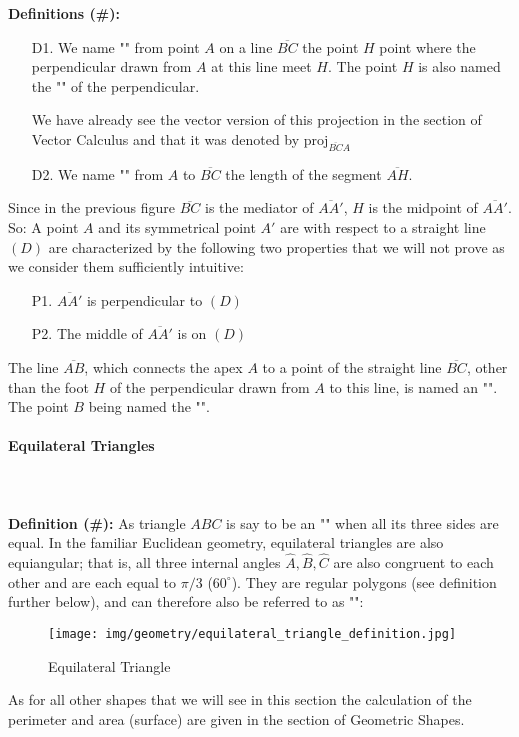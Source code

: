 	\textbf{Definitions (\#\mydef):}
	\begin{enumerate}
		\item[D1.] We name "" from point $A$ on a line $\overline{BC}$ the point $H$ point where the perpendicular drawn from $A$ at this line meet $H$. The  point $H$ is also named the "" of the perpendicular.

		We have already see the vector version of this projection in the section of Vector Calculus and that it was denoted by $\text{proj}_{\overline{BC} A}$

		\item[D2.] We name "" from $A$ to $\overline{BC}$ the length of the segment $\overline{AH}$.
	\end{enumerate}
	Since in the previous figure $\overline{BC}$ is the mediator of $\overline{AA'}$, $H$ is the midpoint of $\overline{AA'}$. So: A point $A$ and its symmetrical point $A'$ are with respect to a straight line $(D)$ are characterized by the following two properties that we will not prove as we consider them sufficiently intuitive:
	\begin{enumerate}
		\item[P1.] $\overline{AA'}$ is perpendicular to $(D)$
		
		\item[P2.]  The middle of $\overline{AA'}$ is on $(D)$
	\end{enumerate}
	The line $\overline{AB}$, which connects the apex $A$ to a point of the straight line $\overline{BC}$, other than the foot $H$ of the perpendicular drawn from $A$ to this line, is named an "". The point $B$ being named the "".
	
	\pagebreak
	\paragraph{Equilateral Triangles}\mbox{}\\\\
	\textbf{Definition (\#\mydef):} As triangle $ABC$ is say to be an "\label{equilateral triangle}" when all its three sides are equal. In the familiar Euclidean geometry, equilateral triangles are also equiangular; that is, all three internal angles $\hat{A},\hat{B},\hat{C}$ are also congruent to each other and are each equal to $\pi/3$ ($60^\circ$). They are regular polygons (see definition further below), and can therefore also be referred to as "":
	\begin{figure}[H]
		\centering
		\texttt{[image: img/geometry/equilateral\_triangle\_definition.jpg]}
		\caption{Equilateral Triangle}
	\end{figure}
	As for all other shapes that we will see in this section the calculation of the perimeter and area (surface) are given in the section of Geometric Shapes.
	
